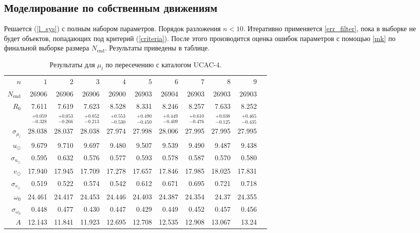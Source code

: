 \documentclass{matmex-diploma-custom}
\begin{document}
\subsection{Моделирование по собственным движениям} \label{mu_res}
Решается (\ref{l_sys}) с полным набором параметров. Порядок разложения $n < 10$. Итеративно применяется \ref{err_filter}, пока в выборке не будет объектов, попадающих под критерий (\ref{criteria}). После этого производится оценка ошибок параметров с помощью \ref{mk} по финальной выборке размера $N_{\mathrm{end}}$. Результаты приведены в таблице. 
\begin{table}[h!!]
\centering
\caption{Результаты для $\mu_l$ по пересечению с каталогом UCAC-4.}
\begin{tabular}{r|rrr|rr|rrrrr}
\hline
$n$ & $1$ & $2$ & $3$ & $4$ & $5$&$ 6 $&$ 7 $&$ 8 $&$ 9 $\\
 $N_{\mathrm{end}}$ & 26906       &   26906 &   26906 &   26900 &   26903 &   26904 &   26903 &   26903 &   26903 \\
 $R_0 $& 7.611       &   7.619 &   7.623 &   8.528 &   8.331 &   8.246 &   8.257 &   7.633 &   8.252 \\
       & $_{-0.328}^{+0.059} $ & $_{-0.266}^{+0.053}$ & $_{-0.213}^{+0.052}$   & $_{-0.530}^{+0.553}$  & $_{-0.450}^{+0.490}$  & $_{-0.409}^{+0.449}$  & $_{-0.476}^{+0.610}$  & $_{-0.125}^{+0.038}$  & $_{-0.435}^{+0.465}$  \\\hline
 $\sigma_{\mu_l} $& 28.038      &  28.037 &  28.038 &  27.974 &  27.998 &  28.006 &  27.995 &  27.995 &  27.995 \\
 $ u_{\odot} $& 9.679       &    9.710 &   9.697 &    9.480 &   9.507 &   9.539 &    9.490 &   9.487 &   9.438 \\
 $\sigma_{u_{\odot}} $&0.595       &   0.632 &   0.576 &   0.577 &   0.593 &   0.578 &   0.587 &    0.570 &    0.580 \\
 $v_{\odot} $& 17.940      &  17.945 &  17.709 &  17.278 &  17.657 &  17.846 &  17.985 &  18.025 &  17.831 \\
 $\sigma_{v_{\odot}}$&0.519       &   0.522 &   0.574 &   0.542 &   0.612 &   0.671 &   0.695 &   0.721 &   0.718 \\
 $\omega_0 $&24.461      &  24.417 &  24.453 &  24.446 &  24.403 &  24.387 &  24.354 &   24.37 &  24.355 \\
 $\sigma_{\omega_0} $& 0.448       &   0.477 &    0.430 &   0.447 &   0.429 &   0.449 &   0.452 &   0.457 &   0.456 \\\hline
 $A $&12.143      &  11.841 &  11.923 &  12.695 &  12.708 &  12.535 &  12.908 &  13.067 &   13.24 \\

\end{tabular}
\end{table}
\end{document}
